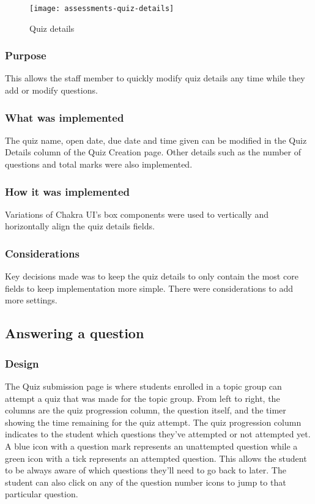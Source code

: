 \begin{figure}[h!]
	\centering
	\texttt{[image: assessments-quiz-details]}
	\caption{Quiz details}
\end{figure}

\subsubsection{Purpose}
This allows the staff member to quickly modify quiz details any time while they add or modify questions.

\subsubsection{What was implemented}
The quiz name, open date, due date and time given can be modified in the Quiz Details column of the Quiz Creation page. Other details such as the number of questions and total marks were also implemented.

\subsubsection{How it was implemented}
Variations of Chakra UI's box components were used to vertically and horizontally align the quiz details fields.

\subsubsection{Considerations}
Key decisions made was to keep the quiz details to only contain the most core fields to keep implementation more simple. There were considerations to add more settings.

\subsection{Answering a question}

\subsubsection{Design}
The Quiz submission page is where students enrolled in a topic group can attempt a quiz that was made for the topic group. From left to right, the columns are the quiz progression column, the question itself, and the timer showing the time remaining for the quiz attempt. The quiz progression column indicates to the student which questions they've attempted or not attempted yet. A blue icon with a question mark represents an unattempted question while a green icon with a tick represents an attempted question. This allows the student to be always aware of which questions they'll need to go back to later. The student can also click on any of the question number icons to jump to that particular question. 

